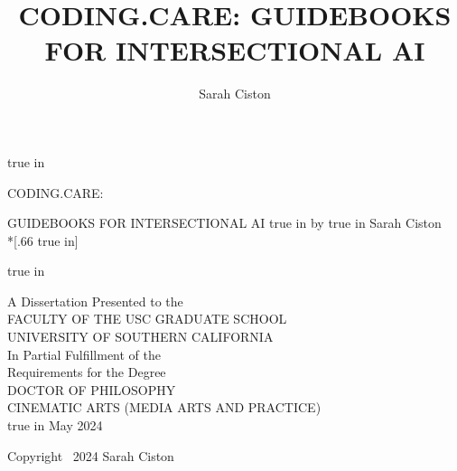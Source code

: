 \documentclass[11pt,oneside]{scrbook} %
\title{CODING.CARE: GUIDEBOOKS FOR INTERSECTIONAL AI}
\author{Sarah Ciston}
\begin{document}
\frontmatter
\pagestyle{empty}%
\begin{singlespace}%
    \hypersetup{hidelinks}
  \large  %
    \setcounter{page}{0}%
    \null
     true in
    \begin{center} 
    \begin{doublespace}
        CODING.CARE: \par
        GUIDEBOOKS FOR INTERSECTIONAL AI
       true in
      by%
       true in
      Sarah Ciston\\*[.66 true in]%
      \par
       true in
    \end{doublespace}
      A Dissertation Presented to the\\%
      FACULTY OF THE USC GRADUATE SCHOOL\\%
      UNIVERSITY OF SOUTHERN CALIFORNIA\\%
      In Partial Fulfillment of the\\%
      Requirements for the Degree\\%
      DOCTOR OF PHILOSOPHY\\%
      CINEMATIC ARTS (MEDIA ARTS AND PRACTICE)\\%
       true in
      May 2024%
    \end{center}%
    \par
    \vfill
          \noindent Copyright~ 2024 \hfill Sarah Ciston
    \end{singlespace}
\end{document}
